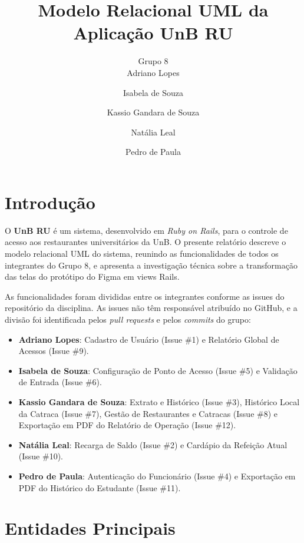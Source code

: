 \documentclass[a4paper,12pt]{article}
\title{Modelo Relacional UML da Aplicação UnB RU}
\author{Grupo 8\\[0.5em]
Adriano Lopes \and Isabela de Souza \and Kassio Gandara de Souza \and Natália Leal \and Pedro de Paula}
\date{}
\renewcommand{\_}{\textunderscore\allowbreak}
\begin{document}
\maketitle

\section*{Introdução}

O \textbf{UnB RU} é um sistema, desenvolvido em \textit{Ruby on Rails}, para o controle de acesso aos restaurantes universitários da UnB. O presente relatório descreve o modelo relacional UML do sistema, reunindo as funcionalidades de todos os integrantes do Grupo 8, e apresenta a investigação técnica sobre a transformação das telas do protótipo do Figma em views Rails.

As funcionalidades foram divididas entre os integrantes conforme as issues do repositório da disciplina. As issues não têm responsável atribuído no GitHub, e a divisão foi identificada pelos \textit{pull requests} e pelos \textit{commits} do grupo:

\begin{itemize}

    \item \textbf{Adriano Lopes}: Cadastro de Usuário (Issue \#1) e Relatório Global de Acessos (Issue \#9).

    \item \textbf{Isabela de Souza}: Configuração de Ponto de Acesso (Issue \#5) e Validação de Entrada (Issue \#6).

    \item \textbf{Kassio Gandara de Souza}: Extrato e Histórico (Issue \#3), Histórico Local da Catraca (Issue \#7), Gestão de Restaurantes e Catracas (Issue \#8) e Exportação em PDF do Relatório de Operação (Issue \#12).

    \item \textbf{Natália Leal}: Recarga de Saldo (Issue \#2) e Cardápio da Refeição Atual (Issue \#10).

    \item \textbf{Pedro de Paula}: Autenticação do Funcionário (Issue \#4) e Exportação em PDF do Histórico do Estudante (Issue \#11).

\end{itemize}

\section*{Entidades Principais}
\end{document}

